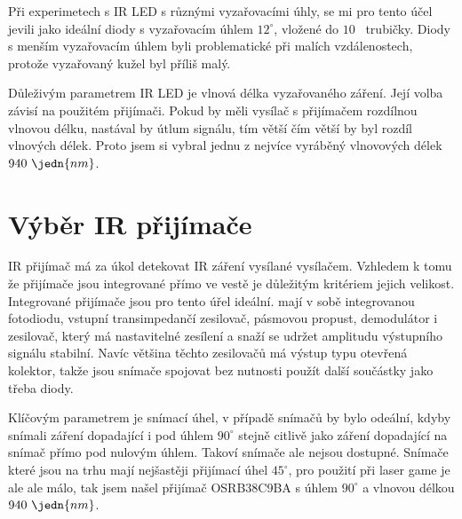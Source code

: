 Při experimetech s IR LED s různými vyzařovacími úhly, se mi pro tento účel jevili jako ideální diody s vyzařovacím úhlem $12^\circ$, vložené do $10$~ trubičky. Diody s menším vyzařovacím úhlem byli problematické při malích vzdálenostech, protože vyzařovaný kužel byl příliš malý.

Důleživým parametrem IR LED je vlnová délka vyzařovaného záření. Její volba závisí na použitém přijímači. Pokud by měli vysílač s přijímačem rozdílnou vlnovou délku, nastával by útlum signálu, tím větší čím větší by byl rozdíl vlnových délek. Proto jsem si vybral jednu z nejvíce vyráběný vlnovových délek $940~\jedn{nm}$.

\section{Výběr IR přijímače}
IR přijímač má za úkol detekovat IR záření vysílané vysílačem. Vzhledem k tomu že přijímače jsou integrované přímo ve vestě je důležitým kritériem jejich velikost. Integrované přijímače jsou pro tento úřel ideální. mají v sobě integrovanou fotodiodu, vstupní transimpedančí zesilovač, pásmovou propust, demodulátor i zesilovač, který má nastavitelné zesílení a snaží se udržet amplitudu výstupního signálu stabilní. Navíc většina těchto zesilovačů má výstup typu otevřená kolektor, takže jsou snímače spojovat bez nutnosti použít další součástky jako třeba diody.

Klíčovým parametrem je snímací úhel, v případě snímačů by bylo odeální, kdyby snímali záření dopadající i pod úhlem $90^\circ$ stejně citlivě jako záření dopadající na snímač přímo pod nulovým úhlem. Takoví snímače ale nejsou dostupné. Snímače které jsou na trhu mají nejšastěji přijímací úhel $45^\circ$, pro použití při laser game je ale ale málo, tak jsem našel přijímač OSRB38C9BA s úhlem $90^\circ$ a vlnovou délkou $940~\jedn{nm}$.

